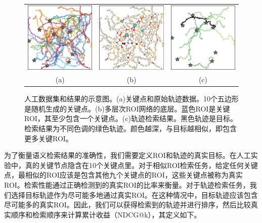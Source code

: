 \tabcolsep=1pt
\begin{figure}[!t]
\centering
\begin{tabular}{ccc}
\includegraphics[width=48mm]{pics/syn1.eps}&
\includegraphics[width=48mm]{pics/syn2.eps}&
\includegraphics[width=48mm]{pics/syn3.eps}\\
(a) & (b) & (c) \\
\end{tabular}
\caption{
人工数据集和结果的示意图。(a)关键点和原始轨迹数据。10个五边形是随机生成的关键点。(b)多层次ROI网络的底层。蓝色ROI是关键ROI，其至少包含一个关键点。(c)轨迹检索结果。黑色轨迹是目标。检索结果为不同色调的绿色轨迹。颜色越深，与目标越相似，即包含更多关键ROI。}
\label{fig:syn}
\end{figure}


为了衡量语义检索结果的准确性，我们需要定义ROI和轨迹的真实目标。在人工实验中，真的关键节点隐含在10个关键点里。对于相似ROI检索任务，给定任何关键点，最相似的ROI应该是包含其他九个关键点的ROI，这些关键点被称为真实ROI。检索性能通过正确检测到的真实ROI的比率来衡量。对于轨迹检索任务，我们选择目标轨迹作为尽可能多地通过真实ROI。在这种情况中，目标轨迹应该包含尽可能多的真实ROI。因此，我们可以获得检索到的轨迹并进行排序，然后比较真实顺序和检索顺序来计算累计收益（NDCG@k），其定义如下。

